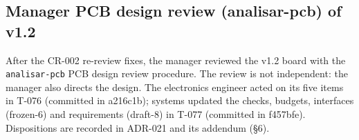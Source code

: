 \subsection{Manager PCB design review (analisar-pcb) of v1.2}
\label{sec:manager-pcb-review}
After the CR-002 re-review fixes, the manager reviewed the v1.2 board with the
\texttt{analisar-pcb} PCB design review procedure. The review is not independent:
the manager also directs the design. The electronics engineer acted on its five
items in T-076 (committed in a216c1b); systems updated the checks, budgets,
interfaces (frozen-6) and requirements (draft-8) in T-077 (committed in f457bfe).
Dispositions are recorded in ADR-021 and its addendum
 (\S6).

